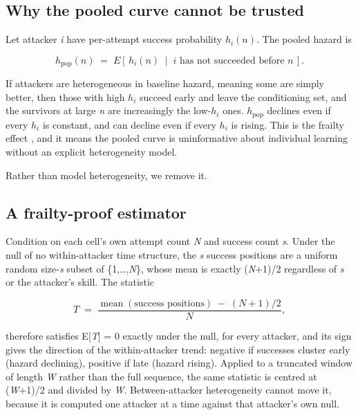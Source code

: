\documentclass[conference]{IEEEtran}
\begin{document}
\subsection{Why the pooled curve cannot be trusted}

Let attacker \textit{i} have per-attempt success probability $h_{i}(n)$. The pooled hazard is

\begin{equation*}
h_{\mathrm{pop}}(n) \;=\; E\!\left[\, h_i(n) \;\middle|\; i \text{ has not succeeded before } n \,\right].
\end{equation*}

If attackers are heterogeneous in baseline hazard, meaning some are simply better, then those with high $h_{i}$ succeed early and leave the conditioning set, and the survivors at large \textit{n} are increasingly the low-$h_{i}$ ones. $h_{\mathrm{pop}}$ declines even if every $h_{i}$ is constant, and can decline even if every $h_{i}$ is rising. This is the frailty effect \cite{vaupel}, and it means the pooled curve is uninformative about individual learning without an explicit heterogeneity model.

Rather than model heterogeneity, we remove it.


\subsection{A frailty-proof estimator}

Condition on each cell's own attempt count \textit{N} and success count \textit{s}. Under the null of no within-attacker time structure, the \textit{s} success positions are a uniform random size-\textit{s} subset of \{1,\ldots,\textit{N}\}, whose mean is exactly (\textit{N}+1)/2 regardless of \textit{s} or the attacker's skill. The statistic

\begin{equation*}
T \;=\; \frac{\operatorname{mean}(\text{success positions}) \;-\; (N+1)/2}{N},
\end{equation*}

therefore satisfies E[\textit{T}] = 0 exactly under the null, for every attacker, and its sign gives the direction of the within-attacker trend: negative if successes cluster early (hazard declining), positive if late (hazard rising). Applied to a truncated window of length \textit{W} rather than the full sequence, the same statistic is centred at (\textit{W}+1)/2 and divided by \textit{W}. Between-attacker heterogeneity cannot move it, because it is computed one attacker at a time against that attacker's own null.
\end{document}
